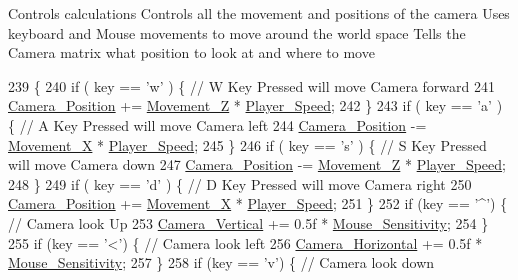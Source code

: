 Controls calculations Controls all the movement and positions of the camera Uses keyboard and Mouse movements to move around the world space Tells the Camera matrix what position to look at and where to move 
\begin{DoxyCode}
239                                        \{
240   \textcolor{keywordflow}{if} ( key == \textcolor{charliteral}{'w'} ) \{        \textcolor{comment}{// W Key Pressed will move Camera forward}
241         \hyperlink{classGameWorld_ad80e597474ea4c52a583e81788187571}{Camera\_Position} += \hyperlink{classGameWorld_a8dd30ba92e7fa9b9b05075e31d1e7dd8}{Movement\_Z} * \hyperlink{classGameWorld_ae8ab2ac372729cec44ea316f6bdf45ca}{Player\_Speed};
242  \}
243   \textcolor{keywordflow}{if} ( key == \textcolor{charliteral}{'a'} ) \{        \textcolor{comment}{// A Key Pressed will move Camera left}
244         \hyperlink{classGameWorld_ad80e597474ea4c52a583e81788187571}{Camera\_Position} -= \hyperlink{classGameWorld_a968eb29424b68f7cd79a5896c62e944d}{Movement\_X} * \hyperlink{classGameWorld_ae8ab2ac372729cec44ea316f6bdf45ca}{Player\_Speed};
245  \}
246   \textcolor{keywordflow}{if} ( key == \textcolor{charliteral}{'s'} ) \{        \textcolor{comment}{// S Key Pressed will move Camera down}
247         \hyperlink{classGameWorld_ad80e597474ea4c52a583e81788187571}{Camera\_Position} -= \hyperlink{classGameWorld_a8dd30ba92e7fa9b9b05075e31d1e7dd8}{Movement\_Z} * \hyperlink{classGameWorld_ae8ab2ac372729cec44ea316f6bdf45ca}{Player\_Speed};
248  \}
249   \textcolor{keywordflow}{if} ( key == \textcolor{charliteral}{'d'} ) \{        \textcolor{comment}{// D Key Pressed will move Camera right}
250         \hyperlink{classGameWorld_ad80e597474ea4c52a583e81788187571}{Camera\_Position} += \hyperlink{classGameWorld_a968eb29424b68f7cd79a5896c62e944d}{Movement\_X} * \hyperlink{classGameWorld_ae8ab2ac372729cec44ea316f6bdf45ca}{Player\_Speed};
251  \}
252   \textcolor{keywordflow}{if} (key == \textcolor{charliteral}{'^'}) \{          \textcolor{comment}{// Camera look Up}
253         \hyperlink{classGameWorld_a26658e739c4d267b1be35ed820089931}{Camera\_Vertical} += 0.5f * \hyperlink{classGameWorld_a9bf4eb977e6ab9299aaef1345c4fa4dd}{Mouse\_Sensitivity};
254  \}
255   \textcolor{keywordflow}{if} (key == \textcolor{charliteral}{'<'}) \{          \textcolor{comment}{// Camera look left}
256         \hyperlink{classGameWorld_a7f4911dda9b3b4e4eb03ece87e16cd96}{Camera\_Horizontal} += 0.5f * \hyperlink{classGameWorld_a9bf4eb977e6ab9299aaef1345c4fa4dd}{Mouse\_Sensitivity};
257  \}
258   \textcolor{keywordflow}{if} (key == \textcolor{charliteral}{'v'}) \{          \textcolor{comment}{// Camera look down}

\end{DoxyCode}

